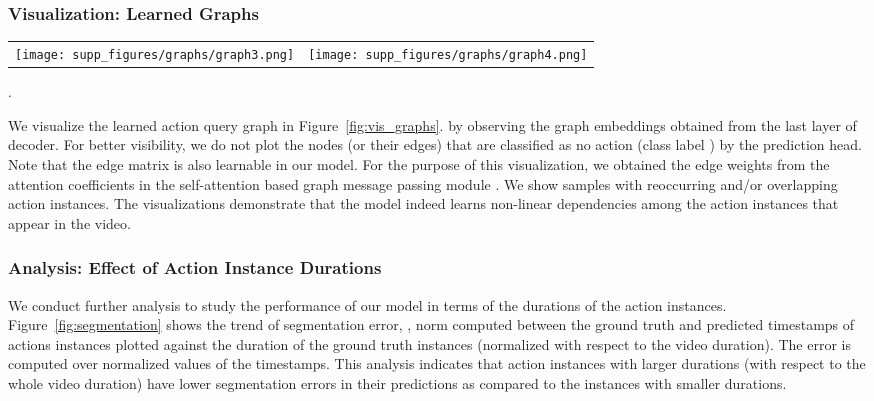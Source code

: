 \documentclass[10pt,twocolumn,letterpaper]{article}
\begin{document}
\subsubsection{Visualization: Learned Graphs}
\label{subsec:vis_graphs}
\begin{figure*}
    \begin{tabular}{c c}
        \texttt{[image: supp\_figures/graphs/graph3.png]}
         & 
         \texttt{[image: supp\_figures/graphs/graph4.png]}


\end{tabular}
    \caption{\textbf{Visualization: Learned Graphs. } Visualizations of embeddings corresponding to the last layer of the decoder and ground truth instances. The thickness of edges show the strength of interaction between the nodes. For ease of visibility, the nodes have been numbered based on the order of their predictions sorted with respect to the start time (\ie, node 0 represents the instance that starts first). These visualizations demonstrate that the model indeed learns non-linear dependencies between the action instances in a video. The legend below each figure shows the action labels corresponding to the color coded elements. For details on the visualization process, please refer to Section~\ref{subsec:vis_graphs}}.
    \label{fig:vis_graphs}
\end{figure*} We visualize the learned action query graph in Figure~\ref{fig:vis_graphs}. by observing the graph embeddings obtained from the last layer of decoder. For better visibility, we do not plot the nodes (or their edges) that are classified as no action (\ie class label ) by the prediction head. Note that the edge matrix is also learnable in our model. For the purpose of this visualization, we obtained the edge weights from the attention coefficients in the self-attention based graph message passing module . We show samples with reoccurring and/or overlapping action instances. The visualizations demonstrate that the model indeed learns non-linear dependencies among the action instances that appear in the video.

\subsubsection{Analysis: Effect of Action Instance Durations}\label{subsec:vis_analysis}
We conduct further analysis to study the performance of our model in terms of the durations of the action instances.
Figure~\ref{fig:segmentation} shows the trend of segmentation error, \ie,  norm computed between the ground truth and predicted timestamps of actions instances plotted against the duration of the ground truth instances (normalized with respect to the video duration). The error is computed over normalized values of the timestamps. This analysis indicates that action instances with larger durations (with respect to the whole video duration) have lower segmentation errors in their predictions as compared to the instances with smaller durations. 
\end{document}
